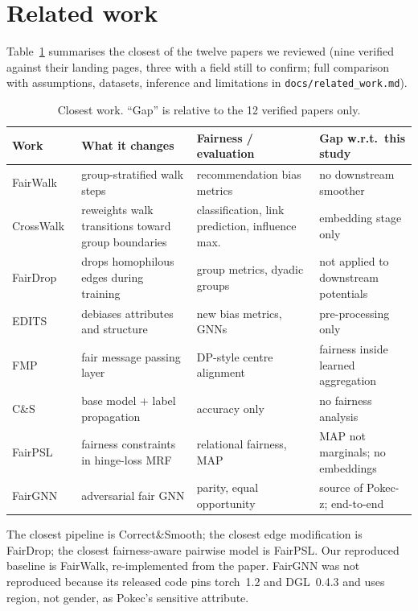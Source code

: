 \documentclass[11pt,a4paper]{article}
\begin{document}
\section{Related work}
Table~\ref{tab:rw} summarises the closest of the twelve papers we reviewed (nine verified against their landing pages, three with a field still to confirm; full comparison with assumptions, datasets, inference and limitations in \texttt{docs/related\_work.md}).
\begin{table}[H]\small\centering
\begin{tabularx}{\linewidth}{lXXX}\toprule
Work & What it changes & Fairness / evaluation & Gap w.r.t.\ this study\\\midrule
FairWalk~\cite{fairwalk} & group-stratified walk steps & recommendation bias metrics & no downstream smoother\\
CrossWalk~\cite{crosswalk} & reweights walk transitions toward group boundaries & classification, link prediction, influence max. & embedding stage only\\
FairDrop~\cite{fairdrop} & drops homophilous edges during training & group metrics, dyadic groups & not applied to downstream potentials\\
EDITS~\cite{edits} & debiases attributes and structure & new bias metrics, GNNs & pre-processing only\\
FMP~\cite{fmp} & fair message passing layer & DP-style centre alignment & fairness inside learned aggregation\\
C\&S~\cite{cs} & base model + label propagation & accuracy only & no fairness analysis\\
FairPSL~\cite{fairpsl} & fairness constraints in hinge-loss MRF & relational fairness, MAP & MAP not marginals; no embeddings\\
FairGNN~\cite{fairgnn} & adversarial fair GNN & parity, equal opportunity & source of Pokec-z; end-to-end\\\bottomrule
\end{tabularx}
\caption{Closest work. ``Gap'' is relative to the 12 verified papers only.}\label{tab:rw}
\end{table}
The closest pipeline is Correct\&Smooth; the closest edge modification is FairDrop; the closest fairness-aware pairwise model is FairPSL. Our reproduced baseline is FairWalk, re-implemented from the paper. FairGNN was not reproduced because its released code pins torch~1.2 and DGL~0.4.3 and uses region, not gender, as Pokec's sensitive attribute.
\end{document}
